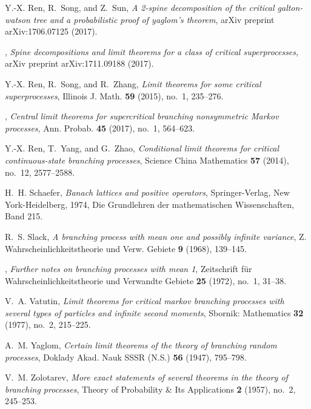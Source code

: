 \documentclass[12pt, a4paper]{amsart}
\theoremstyle{definition}
\numberwithin{equation}{section}
\begin{document}
\begin{thebibliography}{10}
	Y.-X. Ren, R.~Song, and Z.~Sun, \emph{A 2-spine decomposition of the critical
		galton-watson tree and a probabilistic proof of yaglom's theorem}, arXiv
	preprint arXiv:1706.07125 (2017).
	
	\bysame, \emph{Spine decompositions and limit theorems for a class of critical
		superprocesses}, arXiv preprint arXiv:1711.09188 (2017).
	
	Y.-X. Ren, R.~Song, and R.~Zhang, \emph{Limit theorems for some critical
		superprocesses}, Illinois J. Math. \textbf{59} (2015), no.~1, 235--276.
	
	\bysame, \emph{Central limit theorems for supercritical branching nonsymmetric
		{M}arkov processes}, Ann. Probab. \textbf{45} (2017), no.~1, 564--623.
	
	Y.-X. Ren, T.~Yang, and G.~Zhao, \emph{Conditional limit theorems for critical
		continuous-state branching processes}, Science China Mathematics \textbf{57}
	(2014), no.~12, 2577--2588.
	
	H.~H. Schaefer, \emph{Banach lattices and positive operators}, Springer-Verlag,
	New York-Heidelberg, 1974, Die Grundlehren der mathematischen Wissenschaften,
	Band 215. 
	
	R.~S. Slack, \emph{A branching process with mean one and possibly infinite
		variance}, Z. Wahrscheinlichkeitstheorie und Verw. Gebiete \textbf{9} (1968),
	139--145. 
	
	\bysame, \emph{Further notes on branching processes with mean 1}, Zeitschrift
	f{\"u}r Wahrscheinlichkeitstheorie und Verwandte Gebiete \textbf{25} (1972),
	no.~1, 31--38.
	
	V.~A. Vatutin, \emph{Limit theorems for critical markov branching processes
		with several types of particles and infinite second moments}, Sbornik:
	Mathematics \textbf{32} (1977), no.~2, 215--225.
	
	A.~M. Yaglom, \emph{Certain limit theorems of the theory of branching random
		processes}, Doklady Akad. Nauk SSSR (N.S.) \textbf{56} (1947), 795--798.
	
	V.~M. Zolotarev, \emph{More exact statements of several theorems in the theory
		of branching processes}, Theory of Probability \& Its Applications \textbf{2}
	(1957), no.~2, 245--253.
	
\end{thebibliography}
\end{document}

